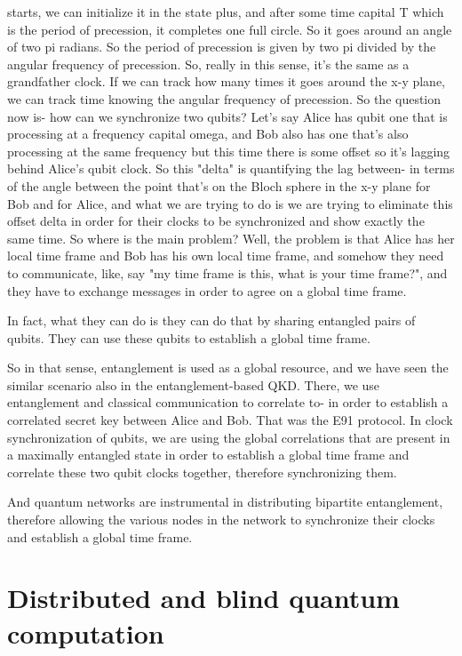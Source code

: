 starts, we can initialize it in the state plus, and after some time capital T which is the period of precession, it completes one full circle. So it goes around an angle of two pi radians. So the period of precession is given by two pi divided by the angular frequency of precession. So, really in this sense, it's the same as a grandfather clock. If we can track how many times it goes around the x-y plane, we can track time knowing the angular frequency of precession. So the question now is- how can we synchronize two qubits? Let's say Alice has qubit one that is processing at a frequency capital omega, and Bob also has one that's also processing at the same frequency but this time there is some offset so it's lagging behind Alice's qubit clock. So this "delta" is quantifying the lag between- in terms of the angle between the point that's on the Bloch sphere in the x-y plane for Bob and for Alice, and what we are trying to do is we are trying to eliminate this offset delta in order for their clocks to be synchronized and show exactly the same time. So where is the main problem? Well, the problem is that Alice has her local time frame and Bob has his own local time frame, and somehow they need to communicate, like, say "my time frame is this, what is your time frame?", and they have to exchange messages in order to agree on a global time frame.

In fact, what they can do is they can do that by sharing entangled pairs of qubits. They can use these qubits to establish a global time frame.

So in that sense, entanglement is used as a global resource, and we have seen the similar scenario also in the entanglement-based QKD. There, we use entanglement and classical communication to correlate to- in order to establish a correlated secret key between Alice and Bob. That was the E91 protocol. In clock synchronization of qubits, we are using the global correlations that are present in a maximally entangled state in order to establish a global time frame and correlate these two qubit clocks together, therefore synchronizing them.

And quantum networks are instrumental in distributing bipartite entanglement, therefore allowing the various nodes in the network to synchronize their clocks and establish a global time frame.



\section{Distributed and blind quantum computation}

